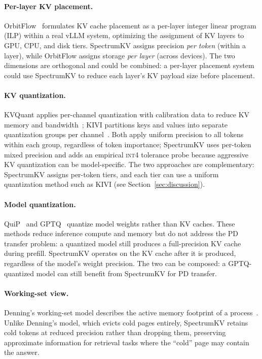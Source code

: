 \documentclass[11pt]{article}
\newcommand{\method}{SpectrumKV}
\newcommand{\intiv}{\textsc{int4}}
\theoremstyle{plain}
\theoremstyle{definition}
\begin{document}
\paragraph{Per-layer KV placement.}
OrbitFlow~\citep{orbitflow} formulates KV cache placement as a per-layer integer linear program (ILP) within a real vLLM system, optimizing the assignment of KV layers to GPU, CPU, and disk tiers.  \method{} assigns precision \emph{per token} (within a layer), while OrbitFlow assigns storage \emph{per layer} (across devices).  The two dimensions are orthogonal and could be combined: a per-layer placement system could use \method{} to reduce each layer's KV payload size before placement.

\paragraph{KV quantization.}
KVQuant applies per-channel quantization with calibration data to reduce KV memory and bandwidth~\citep{kvquant}; KIVI partitions keys and values into separate quantization groups per channel~\citep{kivi}.  Both apply uniform precision to all tokens within each group, regardless of token importance; \method{} uses per-token mixed precision and adds an empirical \intiv{} tolerance probe because aggressive KV quantization can be model-specific.  The two approaches are complementary: \method{} assigns per-token tiers, and each tier can use a uniform quantization method such as KIVI (see Section~\ref{sec:discussion}).

\paragraph{Model quantization.}
QuiP~\citep{quip} and GPTQ~\citep{gptq} quantize model weights rather than KV caches.  These methods reduce inference compute and memory but do not address the PD transfer problem: a quantized model still produces a full-precision KV cache during prefill.  \method{} operates on the KV cache after it is produced, regardless of the model's weight precision.  The two can be composed: a GPTQ-quantized model can still benefit from \method{} for PD transfer.

\paragraph{Working-set view.}
Denning's working-set model describes the active memory footprint of a process~\citep{denning1968working}.  Unlike Denning's model, which evicts cold pages entirely, \method{} retains cold tokens at reduced precision rather than dropping them, preserving approximate information for retrieval tasks where the ``cold'' page may contain the answer.
\end{document}
